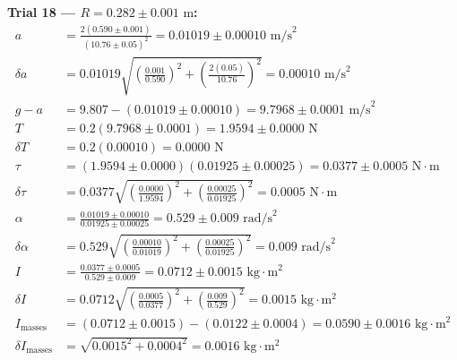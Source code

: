\documentclass[11pt]{article}
\begin{document}
\textbf{Trial 18 — $R = 0.282 \pm 0.001\text{ m}$:}
\begin{align*}
a &= \frac{2(0.590 \pm 0.001)}{(10.76 \pm 0.05)^2} = 0.01019 \pm 0.00010\text{ m/s}^2 \\
\delta a &= 0.01019\sqrt{\left(\frac{0.001}{0.590}\right)^2 + \left(\frac{2(0.05)}{10.76}\right)^2} = 0.00010\text{ m/s}^2 \\
g - a &= 9.807 - (0.01019 \pm 0.00010) = 9.7968 \pm 0.0001\text{ m/s}^2 \\
T &= 0.2(9.7968 \pm 0.0001) = 1.9594 \pm 0.0000\text{ N} \\
\delta T &= 0.2(0.00010) = 0.0000\text{ N} \\
\tau &= (1.9594 \pm 0.0000)(0.01925 \pm 0.00025) = 0.0377 \pm 0.0005\text{ N}\cdot\text{m} \\
\delta\tau &= 0.0377\sqrt{\left(\frac{0.0000}{1.9594}\right)^2 + \left(\frac{0.00025}{0.01925}\right)^2} = 0.0005\text{ N}\cdot\text{m} \\
\alpha &= \frac{0.01019 \pm 0.00010}{0.01925 \pm 0.00025} = 0.529 \pm 0.009\text{ rad/s}^2 \\
\delta\alpha &= 0.529\sqrt{\left(\frac{0.00010}{0.01019}\right)^2 + \left(\frac{0.00025}{0.01925}\right)^2} = 0.009\text{ rad/s}^2 \\
I &= \frac{0.0377 \pm 0.0005}{0.529 \pm 0.009} = 0.0712 \pm 0.0015\text{ kg}\cdot\text{m}^2 \\
\delta I &= 0.0712\sqrt{\left(\frac{0.0005}{0.0377}\right)^2 + \left(\frac{0.009}{0.529}\right)^2} = 0.0015\text{ kg}\cdot\text{m}^2 \\
I_{\text{masses}} &= (0.0712 \pm 0.0015) - (0.0122 \pm 0.0004) = 0.0590 \pm 0.0016\text{ kg}\cdot\text{m}^2 \\
\delta I_{\text{masses}} &= \sqrt{0.0015^2 + 0.0004^2} = 0.0016\text{ kg}\cdot\text{m}^2
\end{align*}
\end{document}

